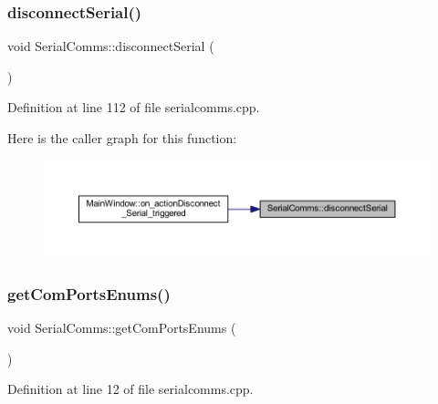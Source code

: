 \subsubsection{\texorpdfstring{disconnectSerial()}{disconnectSerial()}}
{\footnotesize\ttfamily void Serial\+Comms\+::disconnect\+Serial (\begin{DoxyParamCaption}{ }\end{DoxyParamCaption})}



Definition at line 112 of file serialcomms.\+cpp.

Here is the caller graph for this function\+:
\nopagebreak
\begin{figure}[H]
\begin{center}
\leavevmode
\includegraphics[width=350pt]{classSerialComms_a437fbaf140deae42fa64d914f8d13ec8_icgraph}
\end{center}
\end{figure}
\mbox{\label{classSerialComms_acea35603a9438747302b04f0b0a81312}} 
\subsubsection{\texorpdfstring{getComPortsEnums()}{getComPortsEnums()}}
{\footnotesize\ttfamily void Serial\+Comms\+::get\+Com\+Ports\+Enums (\begin{DoxyParamCaption}{ }\end{DoxyParamCaption})\hspace{0.3cm}{\ttfamily [private]}}



Definition at line 12 of file serialcomms.\+cpp.

